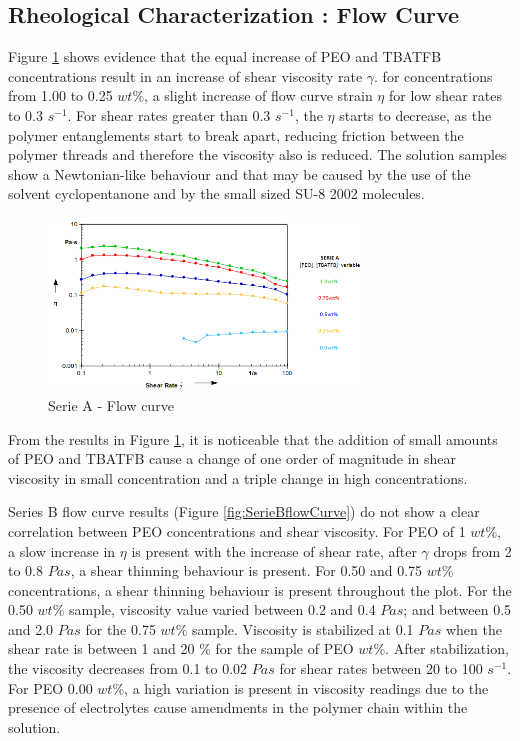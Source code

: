 \subsection{Rheological Characterization : \textbf{Flow Curve}}
Figure \ref{fig:SerieAflowCurve} shows evidence that the equal increase of PEO and TBATFB concentrations result in an increase of shear viscosity rate $\gamma$. for concentrations from 1.00 to 0.25 $w t \%$, a slight increase of flow curve strain $\eta$ for low shear rates to 0.3 $s^{-1}$. For shear rates greater than 0.3 $s^{-1}$, the $\eta$ starts to decrease, as the polymer entanglements start to break apart, reducing friction between the polymer threads and therefore the viscosity also is reduced. The solution samples show a Newtonian-like behaviour and that may be caused by the use of the solvent cyclopentanone and by the small sized SU-8 2002 molecules.

\begin{figure}[th]
\centering
\includegraphics[width=0.75\textwidth]{./Figures/SerieAflowCurve.png}
\decoRule
\caption[Serie A - Flow curve]{Serie A - Flow curve}
\label{fig:SerieAflowCurve}
\end{figure}

From the results in Figure \ref{fig:SerieAflowCurve}, it is noticeable that the addition of small amounts of PEO and TBATFB cause a change of one order of magnitude in shear viscosity in small concentration and a triple change in high concentrations.

Series B flow curve results (Figure \ref{fig:SerieBflowCurve}) do not show a clear correlation between PEO concentrations and shear viscosity. For PEO of 1 $w t \%$, a slow increase in $\eta$ is present with the increase of shear rate, after $\gamma$ drops from 2 to 0.8 $Pa s$, a shear thinning behaviour is present. For 0.50 and 0.75 $w t \%$ concentrations, a shear thinning behaviour is present throughout the plot. For the 0.50 $w t \%$ sample, viscosity value varied between 0.2 and 0.4 $Pa s$; and between 0.5 and 2.0 $Pa s$ for the 0.75 $w t \%$ sample. Viscosity is stabilized at 0.1 $Pa s$ when the shear rate is between 1 and 20 \% for the sample of PEO $w t \%$. After stabilization, the viscosity decreases from 0.1 to 0.02 $Pa s$ for shear rates between 20 to 100 $s^{-1}$. For PEO 0.00 $w t \%$, a high variation is present in viscosity readings due to the presence of electrolytes cause amendments in the polymer chain within the solution.

